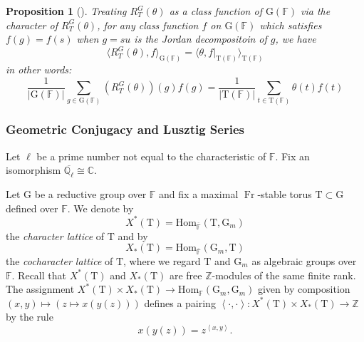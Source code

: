\documentclass[12pt, reqno]{amsart}
\newtheorem{proposition}[theorem]{Proposition}
\theoremstyle{definition}
\theoremstyle{definition}
\theoremstyle{definition}
\newcommand{\zIntegers}{\mathbb{Z}}
\newcommand{\cComplex}{\mathbb{C}}
\newcommand{\Hom}{\mathrm{Hom}}
\newcommand{\innerproduct}[2]{\left\langle #1,#2\right\rangle}
\newcommand{\finiteField}{\mathbb{F}}
\newcommand{\algebraicClosure}[1]{\overline{#1}}
\newcommand{\Frobenius}{\operatorname{Fr}}
\newcommand{\multiplcativeScheme}{\algebraicGroup{G}_m}
\newcommand{\ladicnumbers}{\algebraicClosure{\mathbb{Q}_{\ell}}}
\newcommand{\algebraicGroup}[1]{\boldsymbol{\mathrm{#1}}}
\newcommand{\CharacterLattice}[1]{X^{\ast}\left(#1\right)}
\newcommand{\CocharacterLattice}[1]{X_{\ast}\left(#1\right)}
\begin{document}
\begin{proposition}[{\cite[Corollary 12.7]{DigneMichel1991}}]
\label{prop:semisimple_pair_with_RTtheta}
Treating $R_T^G(\theta)$ as a class function of $\algebraicGroup{G}(\finiteField)$ via the character of $R_T^G(\theta)$, for any class function $f$ on $\algebraicGroup{G}(\finiteField)$ which satisfies $f(g) = f(s)$ when $g=su$ is the Jordan decompositoin of $g$, we have
\[
	\langle R_T^G(\theta),f \rangle_{\algebraicGroup{G}(\finiteField)} = \langle \theta, f|_{\algebraicGroup{T}(\finiteField)}\rangle_{\algebraicGroup{T}(\finiteField)}
\]
in other words:
\[
	\frac{1}{|\algebraicGroup{G}(\finiteField)|}\sum_{g \in \algebraicGroup{G}(\finiteField)}\left(R_T^G(\theta)\right)(g)f(g) = \frac{1}{|\algebraicGroup{T}(\finiteField)|}\sum_{t \in  \algebraicGroup{T}(\finiteField)} \theta(t)f(t)
\]
\end{proposition}

\subsubsection{Geometric Conjugacy and Lusztig Series}
Let $\ell$ be a prime number not equal to the characteristic of $\finiteField$. Fix an isomorphism $\ladicnumbers \cong \cComplex$.

Let $\algebraicGroup{G}$ be a reductive group over $\finiteField$ and fix a maximal $\Frobenius$-stable torus $\algebraicGroup{T} \subset \algebraicGroup{G}$ defined over $\finiteField$. We denote by $$\CharacterLattice{\algebraicGroup{T}} = \Hom_{\algebraicClosure{\finiteField}}\left(\algebraicGroup{T}, \multiplcativeScheme\right)$$ the \emph{character lattice} of $\algebraicGroup{T}$ and by $$\CocharacterLattice{\algebraicGroup{T}} = \Hom_{\algebraicClosure{\finiteField}}\left(\multiplcativeScheme, \algebraicGroup{T}\right)$$ the \emph{cocharacter lattice} of $\algebraicGroup{T}$, where we regard $\algebraicGroup{T}$ and $\multiplcativeScheme$ as algebraic groups over $\finiteField$. Recall that $\CharacterLattice{\algebraicGroup{T}}$ and $\CocharacterLattice{\algebraicGroup{T}}$ are free $\zIntegers$-modules of the same finite rank. The assignment $\CharacterLattice{\algebraicGroup{T}} \times \CocharacterLattice{\algebraicGroup{T}} \to \Hom_{\finiteField}\left(\multiplcativeScheme, \multiplcativeScheme\right)$ given by composition $\left(x,y\right) \mapsto \left(z \mapsto x\left(y\left(z\right)\right)\right)$ defines a pairing $\innerproduct{\cdot}{\cdot} \colon \CharacterLattice{\algebraicGroup{T}} \times \CocharacterLattice{\algebraicGroup{T}} \to \zIntegers$ by the rule $$x\left(y\left(z\right)\right) = z^{\innerproduct{x}{y}}.$$
\end{document}
